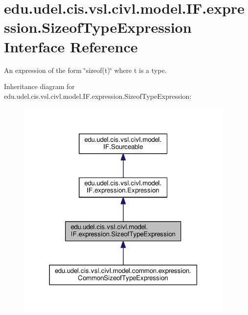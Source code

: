 \hypertarget{interfaceedu_1_1udel_1_1cis_1_1vsl_1_1civl_1_1model_1_1IF_1_1expression_1_1SizeofTypeExpression}{}\section{edu.\+udel.\+cis.\+vsl.\+civl.\+model.\+I\+F.\+expression.\+Sizeof\+Type\+Expression Interface Reference}
\label{interfaceedu_1_1udel_1_1cis_1_1vsl_1_1civl_1_1model_1_1IF_1_1expression_1_1SizeofTypeExpression}


An expression of the form \char`\"{}sizeof(t)\char`\"{} where t is a type.  




Inheritance diagram for edu.\+udel.\+cis.\+vsl.\+civl.\+model.\+I\+F.\+expression.\+Sizeof\+Type\+Expression\+:
\nopagebreak
\begin{figure}[H]
\begin{center}
\leavevmode
\includegraphics[width=306pt]{interfaceedu_1_1udel_1_1cis_1_1vsl_1_1civl_1_1model_1_1IF_1_1expression_1_1SizeofTypeExpression__inherit__graph}
\end{center}
\end{figure}


